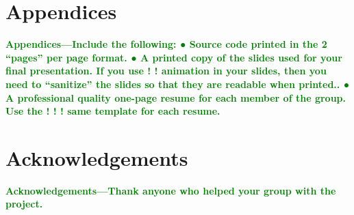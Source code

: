 \documentclass{article}
\numberwithin{equation}{section} %
\begin{document}
\section{Appendices}
\textcolor{green}{\bf Appendices—Include the following:
● Source code printed in the 2 “pages” per page format.
● A printed copy of the slides used for your ﬁnal presentation. If you use 
! ! animation in your slides, then you need to “sanitize” the slides so that they are 
readable when printed..
● A professional quality one-page resume for each member of the group. Use the 
! ! ! same template for each resume.}

\section{Acknowledgements}
\textcolor{green}{\bf Acknowledgements—Thank anyone who helped your group with the project.}
\end{document}
